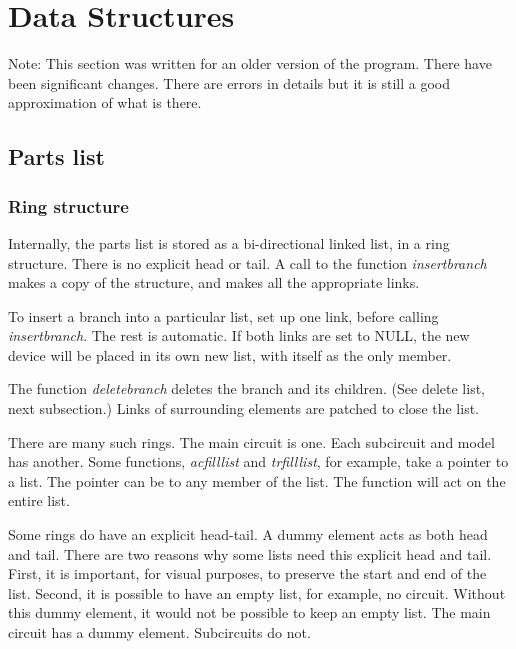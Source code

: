 \section{Data Structures}
Note: This section was written for an older version of the program.  There
have been significant changes.  There are errors in details but it is still
a good approximation of what is there.
\subsection{Parts list}
\subsubsection{Ring structure}

Internally, the parts list is stored as a bi-directional linked list, in a
ring structure.  There is no explicit head or tail.  A call to the function
{\em insertbranch} makes a copy of the structure, and makes all the
appropriate links.

To insert a branch into a particular list, set up one link, before calling
{\em insertbranch}.  The rest is automatic.  If both links are set to NULL,
the new device will be placed in its own new list, with itself as the only
member.

The function {\em deletebranch} deletes the branch and its children.  (See
delete list, next subsection.)  Links of surrounding elements are patched to
close the list.

There are many such rings.  The main circuit is one.  Each subcircuit and
model has another.  Some functions, {\em acfilllist} and {\em trfilllist},
for example, take a pointer to a list.  The pointer can be to any member of
the list.  The function will act on the entire list.

Some rings do have an explicit head-tail.  A dummy element acts as both head
and tail.  There are two reasons why some lists need this explicit head and
tail.  First, it is important, for visual purposes, to preserve the start
and end of the list.  Second, it is possible to have an empty list, for
example, no circuit.  Without this dummy element, it would not be possible
to keep an empty list.  The main circuit has a dummy element.  Subcircuits
do not.
